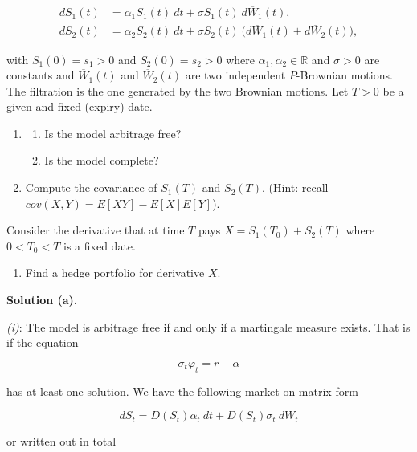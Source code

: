 \documentclass[
]{article}
\providecommand{\tightlist}{%
  \setlength{\itemsep}{0pt}\setlength{\parskip}{0pt}}
\begin{document}
\begin{align*}
dS_1(t)&=\alpha_1S_1(t)\ dt+\sigma S_1(t)\ d\overline{W}_1(t),\\
dS_2(t)&=\alpha_2S_2(t)\ dt+\sigma S_2(t)\ \big(d\overline{W}_1(t)+d\overline{W}_2(t)\big),
\end{align*}

with \(S_1(0)=s_1>0\) and \(S_2(0)=s_2>0\) where
\(\alpha_1,\alpha_2\in\mathbb{R}\) and \(\sigma>0\) are constants and
\(\overline{W}_1(t)\) and \(\overline{W}_2(t)\) are two independent
\(P\)-Brownian motions. The filtration is the one generated by the two
Brownian motions. Let \(T>0\) be a given and fixed (expiry) date.

\begin{enumerate}
\def\labelenumi{\alph{enumi}.}
\item
  \begin{enumerate}
  \def\labelenumii{\roman{enumii}.}
  \tightlist
  \item
    Is the model arbitrage free?
  \item
    Is the model complete?
  \end{enumerate}
\item
  Compute the covariance of \(S_1(T)\) and \(S_2(T)\). (Hint: recall
  \(cov(X,Y)=E[XY]-E[X]E[Y]\)).
\end{enumerate}

Consider the derivative that at time \(T\) pays \(X=S_1(T_0)+S_2(T)\)
where \(0<T_0<T\) is a fixed date.

\begin{enumerate}
\def\labelenumi{\alph{enumi}.}
\setcounter{enumi}{2}
\tightlist
\item
  Find a hedge portfolio for derivative \(X\).
\end{enumerate}

\textbf{Solution (a).}

\emph{(i)}: The model is arbitrage free if and only if a martingale
measure exists. That is if the equation

\[
\sigma_t\varphi_t=r-\alpha
\]

has at least one solution. We have the following market on matrix form

\[
dS_t=D(S_t)\alpha_t\ dt+D(S_t)\sigma _t\ dW_t
\]

or written out in total
\end{document}

